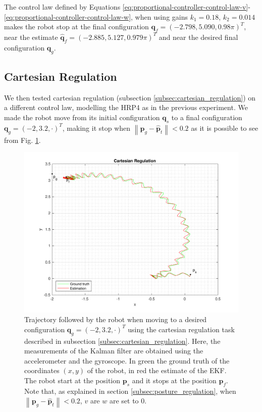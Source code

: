 \documentclass[a4paper]{article}
\begin{document}
The control law defined by Equations
\ref{eq:proportional-controller-control-law-v}-\ref{eq:proportional-controller-control-law-w},
when using gains $k_1=0.18$, $k_2=0.014$ makes the robot stop at the final
configuration $\bm{q}_f = (-2.798, 5.090, 0.98\pi)^T$, near the estimate
$\bm{\hat{q}}_f = (-2.885, 5.127, 0.979\pi)^T$ and
near the desired final configuration $\bm{q}_g$.

\subsection{Cartesian Regulation}
We then tested cartesian regulation (subsection \ref{subsec:cartesian_regulation})
on a different control law, modelling the HRP4 as in the previous experiment.
We made the robot move from its initial
configuration $\bm{q}_s$ to a final configuration $\bm{q}_g = (-2, 3.2, \cdot)^T$,
making it stop when $\left\|\bm{p}_g - \bm{\hat{p}}_t \right\| < 0.2$ as it is
possible to see from Fig. \ref{fig:cartesian_regulation_xy}.
\begin{figure}
    \centering
    \includegraphics[width=\textwidth]{images/cartesian_regulation}
    \caption{Trajectory followed by the robot when moving to a desired configuration
        $\bm{q}_g = (-2, 3.2, \cdot)^T$ using the cartesian regulation task
        described in subsection \ref{subsec:cartesian_regulation}.
        Here, the measurements of the Kalman filter are obtained
        using the accelerometer and the gyroscope. In green the ground truth of the coordinates $(x, y)$ of the
        robot, in red the estimate of the EKF. The robot start at the
        position $\bm{p}_s$ and it stops at the position $\bm{p}_f$. Note that,
        as explained in section \ref{subsec:posture_regulation},
        when $\left\|\bm{p}_g - \bm{\hat{p}}_t \right\| < 0.2$, $v$ are $w$ are set to 0.}
    \label{fig:cartesian_regulation_xy}
\end{figure}
\end{document}
